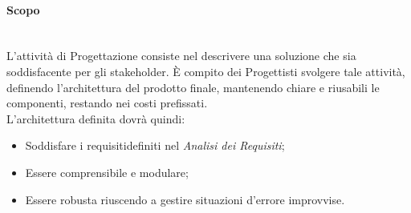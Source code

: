 \paragraph{Scopo}
\label{Progettazione_Scopo} \-\\
L'attività di Progettazione consiste nel descrivere una soluzione che sia soddisfacente per gli stakeholder\glossario. È compito dei Progettisti svolgere tale attività, definendo l'architettura del prodotto finale, mantenendo chiare e riusabili le componenti, restando nei costi prefissati.\\
L'architettura definita dovrà quindi:
\begin{itemize}
	\item Soddisfare i requisiti\glossario  definiti nel \textit{Analisi dei Requisiti};
	\item Essere comprensibile e modulare;
	\item Essere robusta riuscendo a gestire situazioni d'errore improvvise.
\end{itemize}

